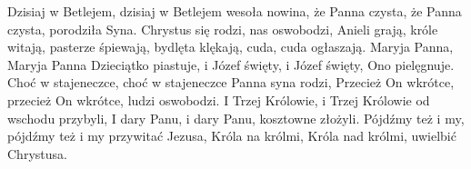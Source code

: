 \beginverse
Dzisiaj w Betlejem, dzisiaj w Betlejem
wesoła nowina,
że Panna czysta, że Panna czysta,
porodziła Syna.
\endverse
\beginchorus
Chrystus się rodzi, nas oswobodzi,
Anieli grają, króle witają,
pasterze śpiewają, bydlęta klękają,
cuda, cuda ogłaszają.
\endchorus
\beginverse
Maryja Panna, Maryja Panna
Dzieciątko piastuje,
i Józef święty, i Józef święty,
Ono pielęgnuje.
\endverse
\beginverse
Choć w stajeneczce, choć w stajeneczce
Panna syna rodzi,
Przecież On wkrótce, przecież On wkrótce,
ludzi oswobodzi.
\endverse
\beginverse
I Trzej Królowie, i Trzej Królowie
od wschodu przybyli,
I dary Panu, i dary Panu,
kosztowne złożyli.
\endverse
\beginverse
Pójdźmy też i my, pójdźmy też i my
przywitać Jezusa,
Króla na królmi, Króla nad królmi,
uwielbić Chrystusa.
\endverse
\endsong